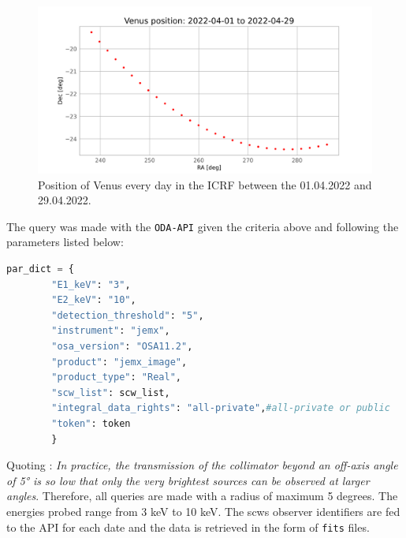     \begin{figure}[H]
        \centering
        \includegraphics[width = 12cm]{report/Figures/methods/Venus_position.png}
        \caption{Position of Venus every day in the ICRF between the 01.04.2022 and 29.04.2022.}
        \label{venus_pos}
    \end{figure}

        The query was made with the \texttt{ODA-API} given the criteria above and following the parameters listed below:
        \begin{lstlisting}[language = Python,caption = Query parameters template used for both dates.,label = dict]
        par_dict = {
        "E1_keV": "3",
        "E2_keV": "10",
        "detection_threshold": "5",
        "instrument": "jemx",
        "osa_version": "OSA11.2",
        "product": "jemx_image",
        "product_type": "Real",
        "scw_list": scw_list,
        "integral_data_rights": "all-private",#all-private or public
        "token": token
        }
        \end{lstlisting}
        Quoting \cite{2020ISDCManual}: \textit{In practice, the transmission of the collimator beyond an off-axis angle of 5° is so low that only the very brightest sources can be observed at larger angles}. Therefore, all queries are made with a radius of maximum 5 degrees. The energies probed range from 3 keV to 10 keV. The scws observer identifiers are fed to the API for each date and the data is retrieved in the form of \texttt{fits} files.

